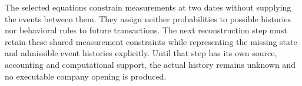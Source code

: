 The selected equations constrain measurements at two dates without supplying
the events between them. They assign neither probabilities to possible
histories nor behavioral rules to future transactions. The next reconstruction
step must retain these shared measurement constraints while representing
the missing state and admissible event histories explicitly. Until that
step has its own source, accounting and computational support, the actual
history remains unknown and no executable company opening is produced.
